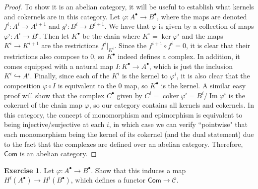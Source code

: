 \documentclass[psamsfonts]{amsart}
\theoremstyle{definition}
\newtheorem{exer}[thm]{Exercise}
\theoremstyle{remark}
\DeclareMathOperator{\im}{Im}
\DeclareMathOperator{\coker}{coker}
\begin{document}
\begin{proof}
To show it is an abelian category, it will be useful to establish what kernels and cokernels are in this category. Let $\varphi : A^\bullet \to B^\bullet$, where the maps are denoted $f^i: A^i \to A^{i+1}$ and $g^i : B^i \to B^{i+1}$. We have that $\varphi$ is given by a collection of maps $\varphi^i : A^i \to B^i$. Then let $K^\bullet$ be the chain where $K^i = \ker\varphi^i$ and the maps $K^i \to K^{i+1}$ are the restrictions $f^i\big\vert_{K^i}$. Since the $f^{i+1} \circ f^i = 0$, it is clear that their restrictions also compose to $0$, so $K^\bullet$ indeed defines a complex. In addition, it comes equipped with a natural map $I : K^\bullet \to A^\bullet$, which is just the inclusion $K^i \hookrightarrow A^i$. Finally, since each of the $K^i$ is the kernel to $\varphi^i$, it is also clear that the composition $\varphi \circ I$ is equivalent to the $0$ map, so $K^\bullet$ is the kernel. A similar easy proof will show that the complex $C^\bullet$ given by $C^i = \coker \varphi^i = B^i / \im\varphi^i$ is the cokernel of the chain map $\varphi$, so our category contains all kernels and cokernels. In this category, the concept of monomorphism and epimorphism is equivalent to being injective/surjective at each $i$, in which case we can verify ``pointwise" that each monomorphism being the kernel of its cokernel (and the dual statement) due to the fact that the complexes are defined over an abelian category. Therefore, $\mathsf{Com}$ is an abelian category.
\end{proof}
%
\begin{exer}
Let $\varphi : A^\bullet \to B^\bullet$. Show that this induces a map $H^i(A^\bullet) \to H^i(B^\bullet)$, which defines a functor $\mathsf{Com} \to \mathscr{C}$.
\end{exer}
%
\end{document}
